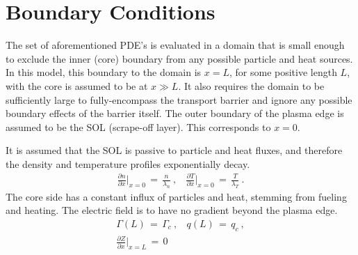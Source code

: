 \section{Boundary Conditions}\label{sec:boundary_conditions}
The set of aforementioned PDE's is evaluated in a domain that is small enough to exclude the inner (core) boundary from any possible particle and heat sources.
In this model, this boundary to the domain is $x = L$, for some positive length $L$, with the core is assumed to be at $x \gg L$.
It also requires the domain to be sufficiently large to fully-encompass the transport barrier and ignore any possible boundary effects of the barrier itself.
The outer boundary of the plasma edge is assumed to be the SOL (scrape-off layer).
This corresponds to $x = 0$.

It is assumed that the SOL is passive to particle and heat fluxes, and therefore the density and temperature profiles exponentially decay.
\begin{align} %
	\frac{\partial n}{\partial x}\biggr \lvert_{x=0} \,=\, \frac{n}{\lambda_n}~, ~~~~ \frac{\partial T}{\partial x}\biggr \lvert_{x=0} \,=\, \frac{T}{\lambda_T}~.\label{eq:nT_SOL_boundary}
\end{align}
The core side has a constant influx of particles and heat, stemming from fueling and heating.
The electric field is to have no gradient beyond the plasma edge.
\begin{align} %
	\Gamma(L) \,=\, \Gamma_c~, ~~~~ q(L) \,=\, q_c~,\label{eq:core_fluxes} \\
	\frac{\partial Z}{\partial x}\biggr \lvert_{x=L} \,=\, 0 \label{eq:core_Z_cond}
\end{align}


